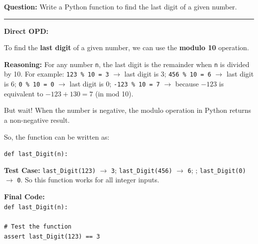 \begin{ReasoningBox}[title={Case Study: Code Generation (Pre-RL/Post-RL Setting)}, breakable]
\textbf{Question:} Write a Python function to find the last digit of a given number.

\medskip
\noindent\rule{\linewidth}{0.4pt}
\medskip

\textbf{Direct OPD:}

To find the \textbf{last digit} of a given number, we can use the \textbf{modulo 10} operation.

\textbf{Reasoning:} For any number \texttt{n}, the last digit is the remainder when \texttt{n} is divided by 10. For example: \texttt{123 \% 10 = 3} $\to$ last digit is 3; \texttt{456 \% 10 = 6} $\to$ last digit is 6; \texttt{0 \% 10 = 0} $\to$ last digit is 0; \texttt{-123 \% 10 = 7} $\to$ because $-123$ is equivalent to $-123 + 130 = 7$ (in mod 10).

But wait! When the number is negative, the modulo operation in Python returns a non-negative result. 

So, the function can be written as:

\hspace*{1em}\texttt{def last\_Digit(n):}\\
\hspace*{2.5em}

\textbf{Test Case:} \texttt{last\_Digit(123)} $\to$ \texttt{3}; \texttt{last\_Digit(456)} $\to$ \texttt{6}; ; \texttt{last\_Digit(0)} $\to$ \texttt{0}. So this function works for all integer inputs.

\textbf{Final Code:}\\
\hspace*{1em}\texttt{def last\_Digit(n):}\\
\hspace*{2.5em}\\[2pt]
\hspace*{1em}\texttt{\# Test the function}\\
\hspace*{1em}\texttt{assert last\_Digit(123) == 3}



\end{ReasoningBox}
